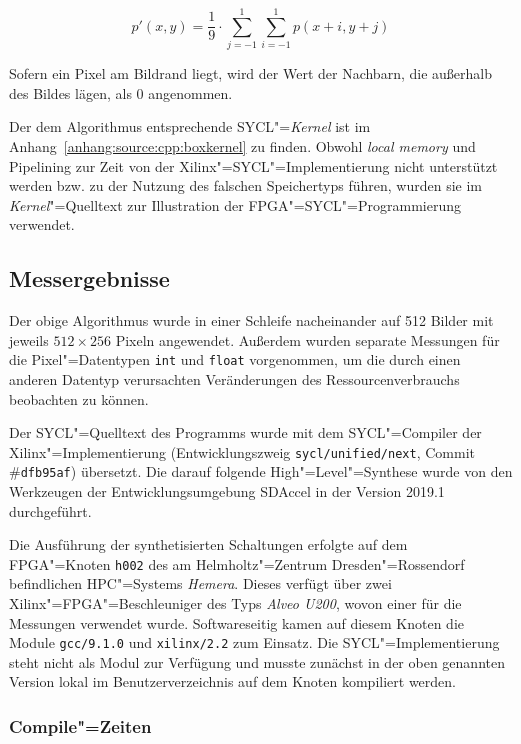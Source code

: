 \begin{equation}
    p'(x, y) = \frac{1}{9} \cdot \sum_{j = {-1}}^{1} \sum_{i = {-1}}^{1} p(x + i, y + j)
\end{equation}

Sofern ein Pixel am Bildrand liegt, wird der Wert der Nachbarn, die außerhalb
des Bildes lägen, als $0$ angenommen.

Der dem Algorithmus entsprechende SYCL"=\textit{Kernel} ist im
Anhang~\ref{anhang:source:cpp:boxkernel} zu finden. Obwohl \textit{local memory}
und Pipelining zur Zeit von der Xilinx"=SYCL"=Implementierung nicht unterstützt
werden bzw. zu der Nutzung des falschen Speichertyps führen, wurden sie im
\textit{Kernel}"=Quelltext zur Illustration der FPGA"=SYCL"=Programmierung
verwendet.

\subsection{Messergebnisse}

Der obige Algorithmus wurde in einer Schleife nacheinander auf \num{512} Bilder
mit jeweils $512 \times 256$ Pixeln angewendet. Außerdem wurden separate
Messungen für die Pixel"=Datentypen \texttt{int} und \texttt{float}
vorgenommen, um die durch einen anderen Datentyp verursachten Veränderungen des
Ressourcenverbrauchs beobachten zu können.

Der SYCL"=Quelltext des Programms wurde mit dem SYCL"=Compiler der
Xilinx"=Implementierung (Entwicklungszweig \texttt{sycl/unified/next},
Commit \#\texttt{dfb95af}) übersetzt. Die darauf folgende High"=Level"=Synthese
wurde von den Werkzeugen der Entwicklungsumgebung SDAccel in der Version 2019.1
durchgeführt.

Die Ausführung der synthetisierten Schaltungen erfolgte auf dem FPGA"=Knoten
\texttt{h002} des am Helmholtz"=Zentrum Dresden"=Rossendorf befindlichen
HPC"=Systems \textit{Hemera}. Dieses verfügt über zwei
Xilinx"=FPGA"=Beschleuniger des Typs \textit{Alveo U200}, wovon einer für die
Messungen verwendet wurde. Softwareseitig kamen auf diesem Knoten die Module
\texttt{gcc/9.1.0} und \texttt{xilinx/2.2} zum Einsatz. Die
SYCL"=Implementierung steht nicht als Modul zur Verfügung und musste zunächst
in der oben genannten Version lokal im Benutzerverzeichnis auf dem Knoten
kompiliert werden.

\subsubsection{Compile"=Zeiten}

